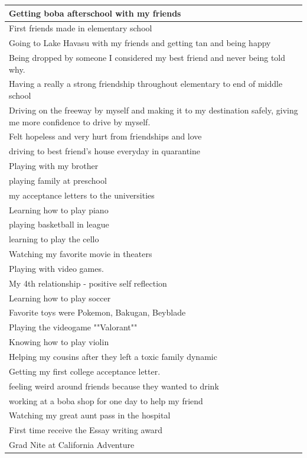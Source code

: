 \documentclass[
  .7em,
  letterpaper,
  DIV=11,
  numbers=noendperiod]{scrartcl}
\begin{document}
\begin{table}
\begin{tabular}{l}
\hline
Getting boba afterschool with my friends\\
\hline
First friends made in elementary school\\
\hline
Going to Lake Havasu with my friends and getting tan and being happy\\
\hline
Being dropped by someone I considered my best friend and never being told why.\\
\hline
Having a really a strong friendship throughout elementary to end of middle school\\
\hline
Driving on the freeway by myself and making it to my destination safely, giving me more confidence to drive by myself.\\
\hline
Felt hopeless and very hurt from friendships and love\\
\hline
driving to best friend's house everyday in quarantine\\
\hline
Playing with my brother\\
\hline
playing family at preschool\\
\hline
my acceptance letters to the universities\\
\hline
Learning how to play piano\\
\hline
playing basketball in league\\
\hline
learning to play the cello\\
\hline
Watching my favorite movie in theaters\\
\hline
Playing with video games.\\
\hline
My 4th relationship - positive self reflection\\
\hline
Learning how to play soccer\\
\hline
Favorite toys were Pokemon, Bakugan, Beyblade\\
\hline
Playing the videogame ""Valorant""\\
\hline
Knowing how to play violin\\
\hline
Helping my cousins after they left a toxic family dynamic\\
\hline
Getting my first college acceptance letter.\\
\hline
feeling weird around friends because they wanted to drink\\
\hline
working at a boba shop for one day to help my friend\\
\hline
Watching my great aunt pass in the hospital\\
\hline
First time receive the Essay writing award\\
\hline
Grad Nite at California Adventure\\

\end{tabular}
\end{table}
\end{document}
